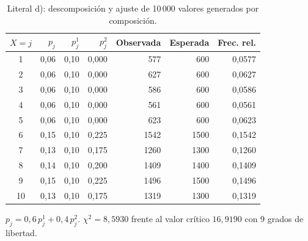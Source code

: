 \begin{table}[H]
\centering
\caption{Literal d): descomposici\'on y ajuste de 10\,000 valores generados por composici\'on.}
\label{tab:53d}
\small
\begin{tabular}{@{}crrrrrr@{}}
\toprule
$X=j$ & $p_j$ & $p_j^{1}$ & $p_j^{2}$ & Observada & Esperada & Frec. rel. \\
\midrule
1 & 0,06 & 0,10 & 0,000 & 577 & 600 & 0,0577 \\
2 & 0,06 & 0,10 & 0,000 & 627 & 600 & 0,0627 \\
3 & 0,06 & 0,10 & 0,000 & 586 & 600 & 0,0586 \\
4 & 0,06 & 0,10 & 0,000 & 561 & 600 & 0,0561 \\
5 & 0,06 & 0,10 & 0,000 & 623 & 600 & 0,0623 \\
6 & 0,15 & 0,10 & 0,225 & 1542 & 1500 & 0,1542 \\
7 & 0,13 & 0,10 & 0,175 & 1260 & 1300 & 0,1260 \\
8 & 0,14 & 0,10 & 0,200 & 1409 & 1400 & 0,1409 \\
9 & 0,15 & 0,10 & 0,225 & 1496 & 1500 & 0,1496 \\
10 & 0,13 & 0,10 & 0,175 & 1319 & 1300 & 0,1319 \\
\bottomrule
\end{tabular}
\begin{minipage}{\textwidth}\vspace{2pt}\footnotesize
$p_j = 0{,}6\,p_j^{1} + 0{,}4\,p_j^{2}$. $\chi^2 = 8{,}5930$ frente al valor cr\'itico $16{,}9190$ con 9 grados de libertad.
\end{minipage}
\end{table}